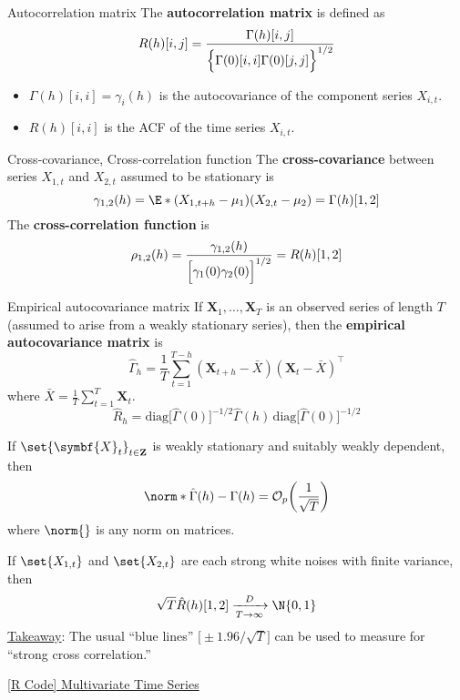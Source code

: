 \begin{Definition}{Autocorrelation matrix}{}
    The \textbf{autocorrelation matrix} is defined as
    \[ R(h)[i,j]=\frac{\Gamma(h)[i,j]}{\Bigl\{\Gamma(0)[i,i]\Gamma(0)[j,j]\Bigr\}^{1/2}}  \]
\end{Definition}
\begin{Remark}{}{}
    \begin{itemize}
        \item $ \Gamma(h)[i,i]=\gamma_i(h) $ is the autocovariance of the component
              series $ X_{i,t} $.
        \item $ R(h)[i,i] $ is the ACF of the time series $ X_{i,t} $.
    \end{itemize}
\end{Remark}
\begin{Definition}{Cross-covariance, Cross-correlation function}{}
    The \textbf{cross-covariance} between series $ X_{1,t} $ and $ X_{2,t} $
    assumed to be stationary is
    \[ \gamma_{1,2}(h)=\E*{(X_{1,t+h}-\mu_1)(X_{2,t}-\mu_2)}=\Gamma(h)[1,2] \]
    The \textbf{cross-correlation function} is
    \[ \rho_{1,2}(h)=\frac{\gamma_{1,2}(h)}{\Bigl[\gamma_1(0)\gamma_2(0)\Bigr]^{1/2}}=R(h)[1,2]  \]
\end{Definition}
\begin{Definition}{Empirical autocovariance matrix}{}
    If $ \symbf{X}_1,\ldots,\symbf{X}_T $ is an observed series of length $ T $
    (assumed to arise from a weakly stationary series), then the
    \textbf{empirical autocovariance matrix} is
    \[ \hat{\Gamma}_h=\frac{1}{T} \sum_{t=1}^{T-h}(\symbf{X}_{t+h}-\bar{X})(\symbf{X}_t-\bar{X})^\top  \]
    where $ \bar{X}=\frac{1}{T} \sum_{t=1}^{T} \symbf{X}_t $.
    \[ \hat{R}_h=\text{diag}\bigl[\hat{\Gamma}(0)\bigr]^{-1/2}\hat{\Gamma}(h)\, \text{diag}\bigl[\hat{\Gamma}(0)\bigr]^{-1/2} \]
\end{Definition}
\begin{Theorem}{}{}
    If $ \set{\symbf{X}_t}_{t\in\mathbf{Z}} $ is weakly stationary and suitably weakly dependent,
    then
    \[ \norm*{\hat{\Gamma}(h)-\Gamma(h)}=\mathcal{O}_p\biggl(\frac{1}{\sqrt{T}}\biggr) \]
    where $ \norm{} $ is any norm on matrices.

    If $ \set{X_{1,t}} $ and $ \set{X_{2,t}} $ are each strong white noises with finite variance,
    then
    \[ \sqrt{T}\hat{R}(h)[1,2]\xrightarrow[T\to\infty]{D}\N{0,1} \]
    \underline{Takeaway}: The usual ``blue lines'' $ \bigl[\pm 1.96/\sqrt{T}\bigr] $
    can be used to measure for ``strong cross correlation.''
\end{Theorem}
\href{https://github.com/Hextical/university-notes/blob/master/year-3/semester-2/STAT%20443/code/11.1%20-%20Multivariate%20Time%20Series.R}{[R Code] Multivariate Time Series}
